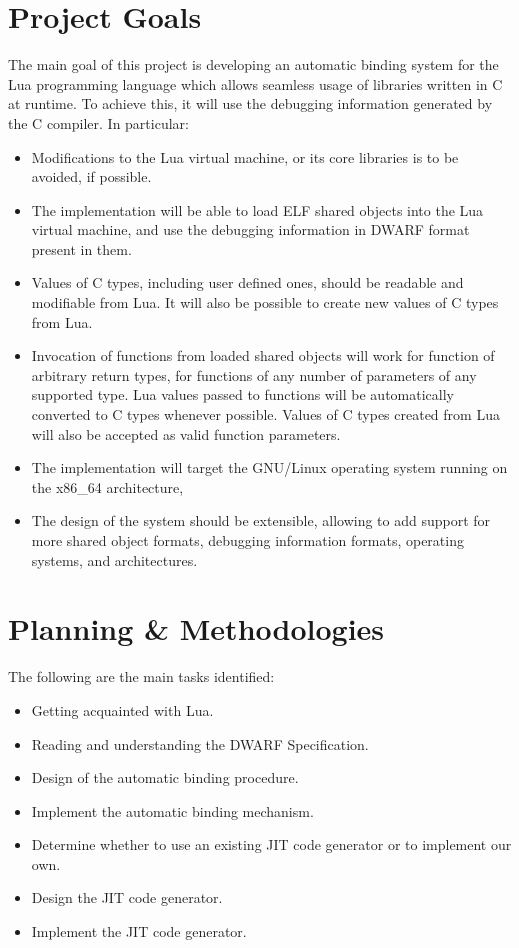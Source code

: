 \section{Project Goals}

The main goal of this project is developing an automatic binding system for
the Lua programming language which allows seamless usage of libraries written
in C at runtime. To achieve this, it will use the debugging information
generated by the C compiler. In particular:

\begin{itemize}
	\item Modifications to the Lua virtual machine, or its core libraries is
		to be avoided, if possible.
	\item The implementation will be able to load \gls{ELF} shared objects
		into the Lua virtual machine, and use the debugging information in
		\gls{DWARF} format present in them.
	\item Values of C types, including user defined ones, should be readable
		and modifiable from Lua. It will also be possible to create new
		values of C types from Lua.
	\item Invocation of functions from loaded shared objects will work for
		function of arbitrary return types, for functions of any number of
		parameters of any supported type. Lua values passed to functions
		will be automatically converted to C types whenever possible. Values
		of C types created from Lua will also be accepted as valid function
		parameters.
	\item The implementation will target the GNU/Linux operating system
		running on the x86\_64 architecture,
	\item The design of the system should be extensible, allowing to add
		support for more shared object formats, debugging information formats,
		operating systems, and architectures.
\end{itemize}


\section{Planning \& Methodologies}

The following are the main tasks identified:

\begin{itemize}
	\item Getting acquainted with Lua.
	\item Reading and understanding the \gls{DWARF} Specification.
	\item Design of the automatic binding procedure.
	\item Implement the automatic binding mechanism.
	\item Determine whether to use an existing JIT code generator or to
		implement our own.
	\item Design the JIT code generator.
	\item Implement the JIT code generator.
\end{itemize}
